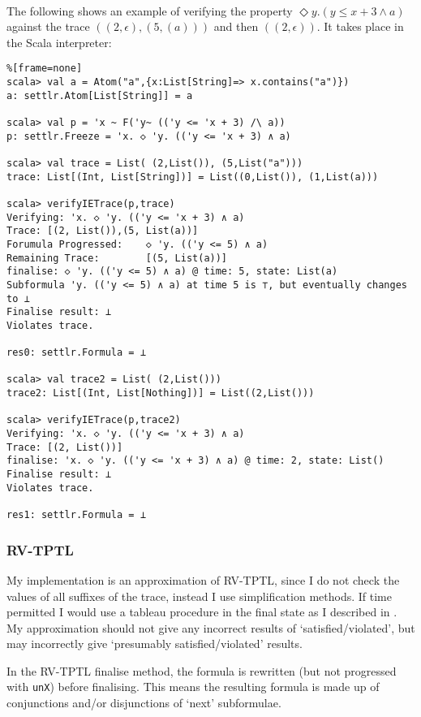 \documentclass[a4paper]{article}
\begin{document}
\begin{eg}\label{ieverifyeg}~\\
  The following shows an example of verifying the property $\Diamond y. (y\leq x + 3 \land a)$ against the trace $((2,\epsilon),(5,(a)))$ and then $((2,\epsilon))$. It takes place in the Scala interpreter:
\begin{lstlisting}%[frame=none]
scala> val a = Atom("a",{x:List[String]=> x.contains("a")})
a: settlr.Atom[List[String]] = a

scala> val p = 'x ~ F('y~ (('y <= 'x + 3) /\ a))
p: settlr.Freeze = 'x. ◇ 'y. (('y <= 'x + 3) ∧ a)

scala> val trace = List( (2,List()), (5,List("a")))
trace: List[(Int, List[String])] = List((0,List()), (1,List(a)))

scala> verifyIETrace(p,trace)
Verifying: 'x. ◇ 'y. (('y <= 'x + 3) ∧ a)
Trace: [(2, List()),(5, List(a))]
Forumula Progressed:    ◇ 'y. (('y <= 5) ∧ a)
Remaining Trace:        [(5, List(a))]
finalise: ◇ 'y. (('y <= 5) ∧ a) @ time: 5, state: List(a)
Subformula 'y. (('y <= 5) ∧ a) at time 5 is ⊤, but eventually changes to ⊥
Finalise result: ⊥
Violates trace.

res0: settlr.Formula = ⊥

scala> val trace2 = List( (2,List()))
trace2: List[(Int, List[Nothing])] = List((2,List()))

scala> verifyIETrace(p,trace2)
Verifying: 'x. ◇ 'y. (('y <= 'x + 3) ∧ a)
Trace: [(2, List())]
finalise: 'x. ◇ 'y. (('y <= 'x + 3) ∧ a) @ time: 2, state: List()
Finalise result: ⊥
Violates trace.

res1: settlr.Formula = ⊥
\end{lstlisting}
\end{eg}

\subsubsection{RV-TPTL}
My implementation is an approximation of RV-TPTL, since I do not check the values of all suffixes of the trace, instead I use simplification methods. If time permitted I would use a tableau procedure in the final state as I described in . My approximation should not give any incorrect results of `satisfied/violated', but may incorrectly give `presumably satisfied/violated' results.

In the RV-TPTL finalise method, the formula is rewritten (but not progressed with \texttt{unX}) before finalising. This means the resulting formula is made up of conjunctions and/or disjunctions of `next' subformulae.
\end{document}
